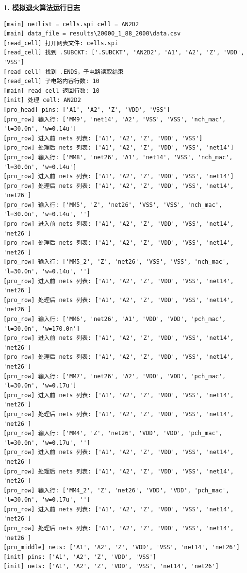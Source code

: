 \documentclass[UTF8,12pt,a4paper]{ctexart}
\begin{document}
\textbf{1. 模拟退火算法运行日志}
\begin{lstlisting}[style=terminal,caption={模拟退火算法运行日志（2000\_1\_88\_2000示例）}]
[main] netlist = cells.spi cell = AN2D2
[main] data_file = results\20000_1_88_2000\data.csv
[read_cell] 打开网表文件: cells.spi
[read_cell] 找到 .SUBCKT: ['.SUBCKT', 'AN2D2', 'A1', 'A2', 'Z', 'VDD', 'VSS']
[read_cell] 找到 .ENDS，子电路读取结束
[read_cell] 子电路内容行数: 10
[main] read_cell 返回行数: 10
[init] 处理 cell: AN2D2
[pro_head] pins: ['A1', 'A2', 'Z', 'VDD', 'VSS']
[pro_row] 输入行: ['MM9', 'net14', 'A2', 'VSS', 'VSS', 'nch_mac', 'l=30.0n', 'w=0.14u']
[pro_row] 进入前 nets 列表: ['A1', 'A2', 'Z', 'VDD', 'VSS']
[pro_row] 处理后 nets 列表: ['A1', 'A2', 'Z', 'VDD', 'VSS', 'net14']
[pro_row] 输入行: ['MM8', 'net26', 'A1', 'net14', 'VSS', 'nch_mac', 'l=30.0n', 'w=0.14u']
[pro_row] 进入前 nets 列表: ['A1', 'A2', 'Z', 'VDD', 'VSS', 'net14']
[pro_row] 处理后 nets 列表: ['A1', 'A2', 'Z', 'VDD', 'VSS', 'net14', 'net26']
[pro_row] 输入行: ['MM5', 'Z', 'net26', 'VSS', 'VSS', 'nch_mac', 'l=30.0n', 'w=0.14u', '']
[pro_row] 进入前 nets 列表: ['A1', 'A2', 'Z', 'VDD', 'VSS', 'net14', 'net26']
[pro_row] 处理后 nets 列表: ['A1', 'A2', 'Z', 'VDD', 'VSS', 'net14', 'net26']
[pro_row] 输入行: ['MM5_2', 'Z', 'net26', 'VSS', 'VSS', 'nch_mac', 'l=30.0n', 'w=0.14u', '']
[pro_row] 进入前 nets 列表: ['A1', 'A2', 'Z', 'VDD', 'VSS', 'net14', 'net26']
[pro_row] 处理后 nets 列表: ['A1', 'A2', 'Z', 'VDD', 'VSS', 'net14', 'net26']
[pro_row] 输入行: ['MM6', 'net26', 'A1', 'VDD', 'VDD', 'pch_mac', 'l=30.0n', 'w=170.0n']
[pro_row] 进入前 nets 列表: ['A1', 'A2', 'Z', 'VDD', 'VSS', 'net14', 'net26']
[pro_row] 处理后 nets 列表: ['A1', 'A2', 'Z', 'VDD', 'VSS', 'net14', 'net26']
[pro_row] 输入行: ['MM7', 'net26', 'A2', 'VDD', 'VDD', 'pch_mac', 'l=30.0n', 'w=0.17u']
[pro_row] 进入前 nets 列表: ['A1', 'A2', 'Z', 'VDD', 'VSS', 'net14', 'net26']
[pro_row] 处理后 nets 列表: ['A1', 'A2', 'Z', 'VDD', 'VSS', 'net14', 'net26']
[pro_row] 输入行: ['MM4', 'Z', 'net26', 'VDD', 'VDD', 'pch_mac', 'l=30.0n', 'w=0.17u', '']
[pro_row] 进入前 nets 列表: ['A1', 'A2', 'Z', 'VDD', 'VSS', 'net14', 'net26']
[pro_row] 处理后 nets 列表: ['A1', 'A2', 'Z', 'VDD', 'VSS', 'net14', 'net26']
[pro_row] 输入行: ['MM4_2', 'Z', 'net26', 'VDD', 'VDD', 'pch_mac', 'l=30.0n', 'w=0.17u', '']
[pro_row] 进入前 nets 列表: ['A1', 'A2', 'Z', 'VDD', 'VSS', 'net14', 'net26']
[pro_row] 处理后 nets 列表: ['A1', 'A2', 'Z', 'VDD', 'VSS', 'net14', 'net26']
[pro_middle] nets: ['A1', 'A2', 'Z', 'VDD', 'VSS', 'net14', 'net26']
[init] pins: ['A1', 'A2', 'Z', 'VDD', 'VSS']
[init] nets: ['A1', 'A2', 'Z', 'VDD', 'VSS', 'net14', 'net26']

\end{lstlisting}
\end{document}
